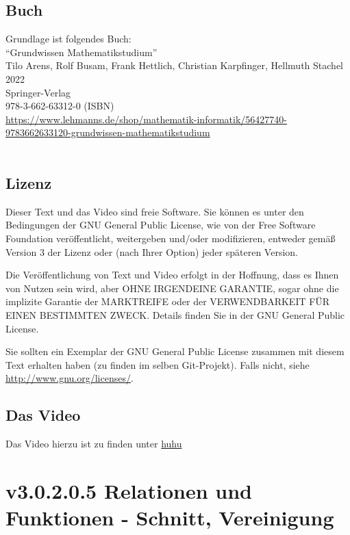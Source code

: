 \documentclass[a4paper]{amsart}
\theoremstyle{definition}
\begin{document}
\subsection*{Buch}
Grundlage ist folgendes Buch:\\
"`Grundwissen Mathematikstudium"'\\
Tilo Arens, Rolf Busam, Frank Hettlich, Christian Karpfinger, Hellmuth Stachel \\
2022\\
Springer-Verlag\\
978-3-662-63312-0 (ISBN)\\
{\tiny
   \url{https://www.lehmanns.de/shop/mathematik-informatik/56427740-9783662633120-grundwissen-mathematikstudium}}\\
\\

\subsection*{Lizenz}
Dieser Text und das Video sind freie Software. Sie können es unter den Bedingungen der
GNU General Public License, wie von der Free Software Foundation veröffentlicht, weitergeben
und/oder modifizieren, entweder gemäß Version 3 der Lizenz oder (nach Ihrer Option) jeder späteren Version.

Die Veröffentlichung von Text und Video erfolgt in der Hoffnung, dass es Ihnen von Nutzen sein wird,
aber OHNE IRGENDEINE GARANTIE, sogar ohne die implizite Garantie der MARKTREIFE oder der
VERWENDBARKEIT FÜR EINEN BESTIMMTEN ZWECK. Details finden Sie in der GNU General Public License.

Sie sollten ein Exemplar der GNU General Public License zusammen mit diesem Text erhalten haben
(zu finden im selben Git-Projekt).
Falls nicht, siehe \url{http://www.gnu.org/licenses/}.

\subsection*{Das Video}
Das Video hierzu ist zu finden unter
{\tiny
   \url{huhu}
}

\section{v3.0.2.0.5 Relationen und Funktionen - Schnitt, Vereinigung}
\end{document}

